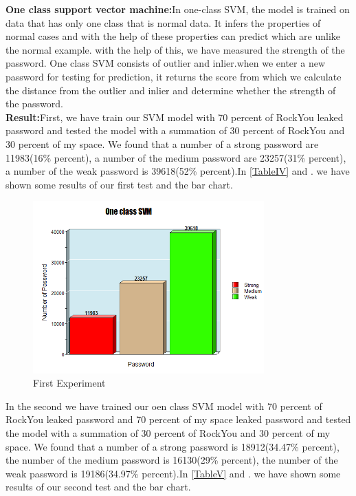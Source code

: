 \documentclass[runningheads]{llncs}
\begin{document}
\newline
\textbf{One class support vector machine:}In one-class SVM, the model is trained on data that has only one class that is normal data. It infers the properties of normal cases and with the help of these properties can predict which are unlike the normal example. with the help of this, we have measured the strength of the password. One class SVM consists of outlier and inlier.when we enter a new password for testing for prediction, it returns the score from which we calculate the distance from the outlier and inlier and determine whether the strength of the password.\\
\textbf{Result:}First, we have train our SVM model with 70 percent of RockYou leaked password and tested the model with a summation of 30 percent of RockYou and 30 percent of my space. We found that a number of a strong password are 11983(16\% percent), a number of the medium password are 23257(31\% percent), a number of the weak password is 39618(52\% percent).In \ref{TableIV} and . we have shown some results of our first test and the bar chart.
\begin{figure}[ht!] %
\centering
\includegraphics[width=3.5in]{First.png}
\caption{First Experiment}
\label{First Experiment }
\end{figure}
\newline
In the second we have trained our oen class SVM model with 70 percent of RockYou leaked password and 70 percent of my space leaked password and tested the model with a summation of 30 percent of RockYou and 30 percent of my space. We found that a number of a strong password is 18912(34.47\% percent), the number of the medium password is 16130(29\% percent), the number of the weak password is 19186(34.97\% percent).In \ref{TableV}  and . we have shown some results of our second test and the bar chart.
\end{document}
